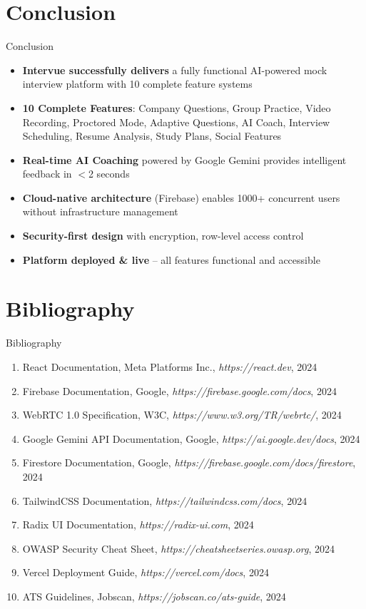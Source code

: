 \documentclass{beamer}
\begin{document}
\section{Conclusion}
\begin{frame}{Conclusion}
\begin{itemize}
    \item \textbf{Intervue successfully delivers} a fully functional AI-powered mock interview platform with 10 complete feature systems
    \item \textbf{10 Complete Features}: Company Questions, Group Practice, Video Recording, Proctored Mode, Adaptive Questions, AI Coach, Interview Scheduling, Resume Analysis, Study Plans, Social Features
    \item \textbf{Real-time AI Coaching} powered by Google Gemini provides intelligent feedback in $<$2 seconds
    \item \textbf{Cloud-native architecture} (Firebase) enables 1000+ concurrent users without infrastructure management
    \item \textbf{Security-first design} with encryption, row-level access control
    \item \textbf{Platform deployed \& live} -- all features functional and accessible
\end{itemize}
\end{frame}

\section{Bibliography}
\begin{frame}{Bibliography}
\scriptsize
\begin{enumerate}
    \item React Documentation, Meta Platforms Inc., \textit{https://react.dev}, 2024
    \item Firebase Documentation, Google, \textit{https://firebase.google.com/docs}, 2024
    \item WebRTC 1.0 Specification, W3C, \textit{https://www.w3.org/TR/webrtc/}, 2024
    \item Google Gemini API Documentation, Google, \textit{https://ai.google.dev/docs}, 2024
    \item Firestore Documentation, Google, \textit{https://firebase.google.com/docs/firestore}, 2024
    \item TailwindCSS Documentation, \textit{https://tailwindcss.com/docs}, 2024
    \item Radix UI Documentation, \textit{https://radix-ui.com}, 2024
    \item OWASP Security Cheat Sheet, \textit{https://cheatsheetseries.owasp.org}, 2024
    \item Vercel Deployment Guide, \textit{https://vercel.com/docs}, 2024
    \item ATS Guidelines, Jobscan, \textit{https://jobscan.co/ats-guide}, 2024
\end{enumerate}
\end{frame}
\end{document}
